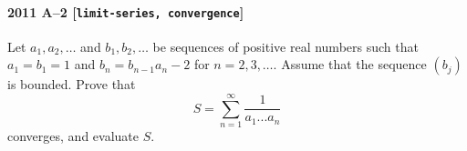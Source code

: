 \paragraph{2011 A--2 \textnormal{[\texttt{limit-series, convergence}]}}
Let $a_1,a_2,\dots$ and $b_1,b_2,\dots$ be sequences of positive
real numbers such that $a_1 = b_1 = 1$ and $b_n = b_{n-1} a_n - 2$ for
$n=2,3,\dots$. Assume that the sequence $(b_j)$ is bounded. Prove that
\[
S = \sum_{n=1}^\infty \frac{1}{a_1...a_n}
\]
converges, and evaluate $S$.
